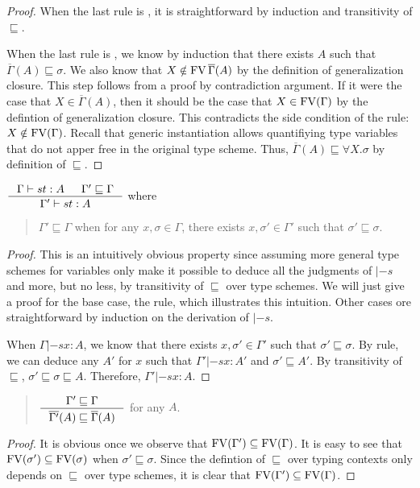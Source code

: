 \begin{proof}
When the last rule is , it is straightforward by induction
and transitivity of $\sqsubseteq$.

When the last rule is , we know by induction that there exists
$A$ such that $\overline{\Gamma}(A) \sqsubseteq \sigma$. We also know
that $X \notin\mathop{\mathrm{FV}} \overline{\Gamma}(A)$ by the definition of generalization closure.
This step follows from a proof by contradiction argument.
If it were the case that $X\in\overline{\Gamma}(A)$, then it should be the case that
$X\in\mathop{\mathrm{FV}}(\Gamma)$
by the defintion of generalization closure. This contradicts the side condition of
the  rule: $X\notin\mathop{\mathrm{FV}}(\Gamma)$.
Recall that generic instantiation allows quantifiying type variables
that do not apper free in the original type scheme. Thus,
$\overline{\Gamma}(A) \sqsubseteq \forall X.\sigma$ by definition
of $\sqsubseteq$.
\end{proof}

\begin{lemma} \label{lem:genGamma}
$ \inference{\Gamma |-s t : A & \Gamma' \sqsubseteq \Gamma}
	    {\Gamma' |-s t : A} $ where
\begin{quote}
$\Gamma' \sqsubseteq \Gamma$ when for any $x,\sigma\in \Gamma$,
there exists $x,\sigma'\in\Gamma'$ such that $\sigma'\sqsubseteq\sigma$.
\end{quote}
\label{lem:generalizeGamma}
\end{lemma}
\begin{proof}
This is an intuitively obvious property since assuming
more general type schemes for variables only make
it possible to deduce all the judgments of $|-s$ and more, but no less,
by transitivity of $\sqsubseteq$ over type schemes.
We will just give a proof for the base case, the  rule,
which illustrates this intuition.
Other cases ore straightforward by induction on the derivation of $|-s$.

When $\Gamma |-s x : A$, we know that there exists
$x,\sigma'\in\Gamma'$ such that $\sigma'\sqsubseteq\sigma$.
By  rule, we can deduce any $A'$ for $x$
such that $\Gamma' |-s x : A'$ and $\sigma'\sqsubseteq A'$.
By transitivity of $\sqsubseteq$, $\sigma' \sqsubseteq \sigma \sqsubseteq A$.
Therefore, $\Gamma' |-s x : A$.
\end{proof}

\begin{lemma}
\begin{quote}
$ \inference{\Gamma' \sqsubseteq \Gamma}
	    {\overline{\Gamma'}(A) \sqsubseteq \overline{\Gamma}(A)} $
for any $A$.
\end{quote}
\label{lem:closureMoreGen}
\end{lemma}
\begin{proof}
It is obvious once we observe that $\mathop{\mathrm{FV}}(\Gamma') \subseteq \mathop{\mathrm{FV}}(\Gamma)$.
It is easy to see that $\mathop{\mathrm{FV}}(\sigma') \subseteq \mathop{\mathrm{FV}}(\sigma)$
when $\sigma' \sqsubseteq \sigma$. Since the defintion of $\sqsubseteq$
over typing contexts only depends on $\sqsubseteq$ over type schemes,
it is clear that $\mathop{\mathrm{FV}}(\Gamma') \subseteq \mathop{\mathrm{FV}}(\Gamma)$.
\end{proof}

